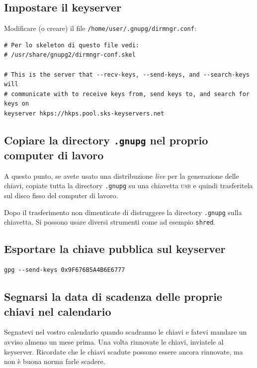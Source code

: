 \documentclass[a4paper,10pt]{article}
\begin{document}
\subsection{Impostare il keyserver}

Modificare (o creare) il file \texttt{/home/user/.gnupg/dirmngr.conf}:

\begin{lstlisting}
# Per lo skeleton di questo file vedi:
# /usr/share/gnupg2/dirmngr-conf.skel

# This is the server that --recv-keys, --send-keys, and --search-keys will
# communicate with to receive keys from, send keys to, and search for keys on
keyserver hkps://hkps.pool.sks-keyservers.net
\end{lstlisting}

\subsection{Copiare la directory \texttt{.gnupg} nel proprio computer di lavoro}

A questo punto, se avete usato una distribuzione \textit{live} per la generazione delle chiavi, copiate tutta la directory \texttt{.gnupg} su una chiavetta \textsc{usb} e quindi trasferitela sul disco fisso del computer di lavoro.

Dopo il trasferimento non dimenticate di distruggere la directory \texttt{.gnupg} sulla chiavetta. Si possono usare diversi strumenti come ad esempio \texttt{shred}.

\subsection{Esportare la chiave pubblica sul keyserver}

\begin{lstlisting}
gpg --send-keys 0x9F676B5A4B6E6777
\end{lstlisting}

\subsection{Segnarsi la data di scadenza delle proprie chiavi nel calendario}

Segnatevi nel vostro calendario quando scadranno le chiavi e fatevi mandare un avviso almeno un mese prima. Una volta rinnovate le chiavi, inviatele al keyserver. Ricordate che le chiavi scadute possono essere ancora rinnovate, ma non è buona norma farle scadere.
\end{document}
